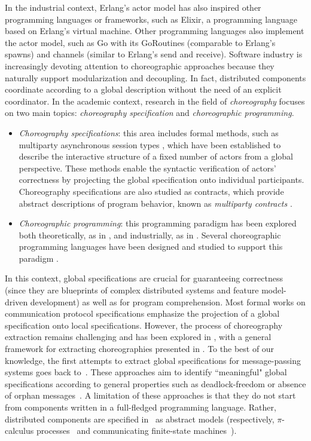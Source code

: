 In the industrial context, Erlang's actor model has also inspired other 
programming languages or frameworks, such as Elixir, a 
programming language based on Erlang's virtual machine. Other programming 
languages also implement the actor model, such as Go with 
its GoRoutines (comparable to Erlang's spawns) and channels (similar to Erlang's
send and receive).
Software industry is increasingly devoting attention to choreographic approaches
\cite{BPMN,bon18,fmmt20,DBLP:journals/software/AutiliIT15} because
they naturally support modularization and decoupling.
%
In fact, distributed components coordinate according to a global
description without the need of an explicit coordinator.
%
In the academic context, research in the field of \textit{choreography} focuses 
on two main topics: \textit{choreography specification} and 
\textit{choreographic programming}.
\begin{itemize}
    \item \textit{Choreography specifications}: this area includes formal 
    methods, such as multiparty asynchronous session types 
    \cite{honda2008multiparty}, which have been established to describe the 
    interactive structure of a fixed number of actors from a global perspective.
    These methods enable the syntactic verification of actors' correctness by 
    projecting the global specification onto individual participants. 
    Choreography specifications are also studied as contracts, which provide 
    abstract descriptions of program behavior, known as \textit{multiparty 
    contracts} \cite{Huttel+16}.
    \item \textit{Choreographic programming}: this programming paradigm has been
    explored both theoretically, as in \cite{website:wscdl}, and industrially, 
    as in \cite{website:bpmn}. Several choreographic programming languages have
    been designed and studied to support this paradigm \cite{montesi2010jolie, 
    montesi2014choreographic, giallorenzo2020object, dalla2014aiocj}.
\end{itemize}
In this context, global specifications are crucial for guaranteeing
correctness (since they are blueprints of complex distributed systems
and feature model-driven development) as well as for program
comprehension. 
Most formal works on communication protocol 
specifications emphasize the projection of a global specification onto local 
specifications. However, the process of choreography extraction remains 
challenging and has been explored in \cite{cflm17}, with a general 
framework for extracting choreographies presented in 
\cite{cruz2022implementing}.
%
To the best of our knowledge, the first attempts to extract global
specifications for message-passing systems goes back
to~\cite{myh09,lt12,lty15}.
%
These approaches aim to identify ``meaningful" global specifications
according to general properties such as deadlock-freedom or absence of
orphan messages~\cite{bz83}.
%
A limitation of these approaches is that they do not start from
components written in a full-fledged programming language.
%
Rather, distributed components are specified in~\cite{lt12,lty15} as
abstract models (respectively, $\pi$-calculus
processes~\cite{sw02,mil99,mpw92} and communicating finite-state
machines~\cite{bz83}).


